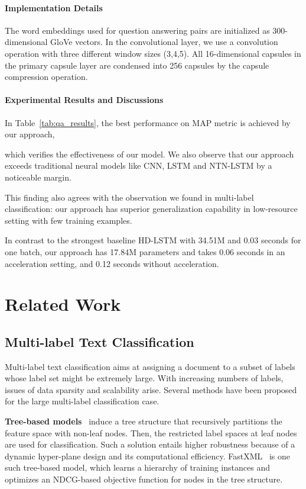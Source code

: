 \documentclass[11pt,a4paper]{article}
\newcommand{\1}{\boldsymbol{1}}
\begin{document}
\paragraph{Implementation Details} The word embeddings used for question answering pairs are initialized as 300-dimensional GloVe vectors. In the convolutional layer, we use a convolution operation with three different window sizes (3,4,5). All 16-dimensional capsules in the primary capsule layer are condensed into 256 capsules by the capsule compression operation.

\paragraph{Experimental Results and Discussions}

In Table~\ref{tab:qa_results}, 
the best performance on MAP metric is achieved by our approach,

which verifies the effectiveness of our model. 
We also observe that our approach exceeds traditional neural models like CNN, LSTM and NTN-LSTM by a noticeable margin. 

This finding also agrees with the observation we found in multi-label classification: our approach has superior generalization capability in low-resource setting with few training examples.

In contrast to the strongest baseline HD-LSTM with 34.51M and 0.03 seconds for one batch, our approach has 17.84M parameters and takes 0.06 seconds in an acceleration setting, and 0.12 seconds without acceleration.

\section{Related Work}\label{sec:related}


\subsection{Multi-label Text Classification}
 Multi-label text classification aims at assigning a document to a subset of labels whose label set might be extremely large. With increasing numbers of labels, issues of data sparsity and scalability arise. 
Several methods have been proposed for the large multi-label classification case. 
 
\textbf{Tree-based models}~\cite{agrawal2013multi,weston2013label} induce a tree structure that recursively partitions the feature space with non-leaf nodes. Then, the restricted label spaces at leaf nodes are used for classification.
Such a solution entails higher robustness because of a dynamic hyper-plane design and its
computational efficiency. 
FastXML~\cite{prabhu2014fastxml} is one such tree-based model, which learns a hierarchy of training instances and optimizes an NDCG-based objective function for nodes in the tree structure.
\end{document}

